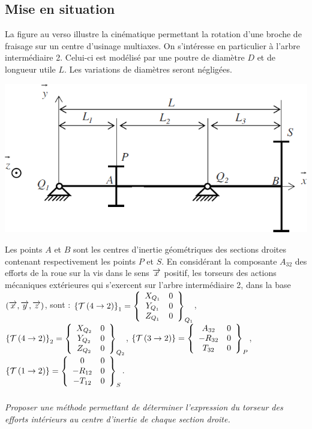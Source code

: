 \documentclass[10pt,fleqn]{article} %
\begin{document}

\vspace{4.5cm}
\pagestyle{fancy}
\thispagestyle{plain}


\def\columnseprulecolor{\color{ocre}}
\setlength{\columnseprule}{0.4pt} 

\begin{multicols}{2}
\section*{Mise en situation}
La figure au verso illustre la cinématique permettant la rotation d'une broche de fraisage sur un centre d'usinage multiaxes.
On s'intéresse en particulier à l'arbre intermédiaire 2. Celui-ci est modélisé  par une poutre de diamètre $D$ et de longueur utile $L$. Les variations de diamètres seront négligées.

\begin{center}
\includegraphics[width=\linewidth]{images/fig_03}
\end{center}

Les points $A$ et $B$ sont les centres d’inertie géométriques des sections droites contenant
respectivement les points $P$ et $S$.
En considérant la composante $A_{32}$ des efforts de la roue sur la vis dans le sens $\vect{x}$ positif, les
torseurs des actions mécaniques extérieures qui s’exercent sur l’arbre intermédiaire 2, dans la base
$\base{x}{y}{z}$, sont :
\footnotesize
$\torseurstat{T}{4}{2}_1 = \torseurcol{X_{Q_1}}{Y_{Q_1}}{Z_{Q_1}}{0}{0}{0}{Q_1}$, 
$\torseurstat{T}{4}{2}_2 = \torseurcol{X_{Q_2}}{Y_{Q_2}}{Z_{Q_2}}{0}{0}{0}{Q_2}$, 
$\torseurstat{T}{3}{2} = \torseurcol{A_{32}}{-R_{32}}{T_{32}}{0}{0}{0}{P}$, 
$\torseurstat{T}{1}{2} = \torseurcol{0}{-R_{12}}{-T_{12}}{0}{0}{0}{S}$.

\normalsize 

\subparagraph{}\textit{Proposer une méthode permettant de déterminer l'expression du torseur des efforts intérieurs au centre d'inertie de chaque section droite.}


\end{multicols}
\end{document}
